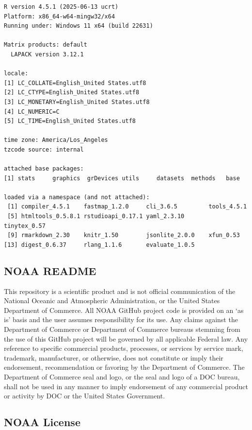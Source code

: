 \documentclass[
  letterpaper,
  oneside,
  open=any]{scrbook}
\begin{document}
\begin{verbatim}
R version 4.5.1 (2025-06-13 ucrt)
Platform: x86_64-w64-mingw32/x64
Running under: Windows 11 x64 (build 22631)

Matrix products: default
  LAPACK version 3.12.1

locale:
[1] LC_COLLATE=English_United States.utf8 
[2] LC_CTYPE=English_United States.utf8   
[3] LC_MONETARY=English_United States.utf8
[4] LC_NUMERIC=C                          
[5] LC_TIME=English_United States.utf8    

time zone: America/Los_Angeles
tzcode source: internal

attached base packages:
[1] stats     graphics  grDevices utils     datasets  methods   base     

loaded via a namespace (and not attached):
 [1] compiler_4.5.1    fastmap_1.2.0     cli_3.6.5         tools_4.5.1      
 [5] htmltools_0.5.8.1 rstudioapi_0.17.1 yaml_2.3.10       tinytex_0.57     
 [9] rmarkdown_2.30    knitr_1.50        jsonlite_2.0.0    xfun_0.53        
[13] digest_0.6.37     rlang_1.1.6       evaluate_1.0.5   
\end{verbatim}

\subsection{NOAA README}\label{noaa-readme-1}

This repository is a scientific product and is not official
communication of the National Oceanic and Atmospheric Administration, or
the United States Department of Commerce. All NOAA GitHub project code
is provided on an `as is' basis and the user assumes responsibility for
its use. Any claims against the Department of Commerce or Department of
Commerce bureaus stemming from the use of this GitHub project will be
governed by all applicable Federal law. Any reference to specific
commercial products, processes, or services by service mark, trademark,
manufacturer, or otherwise, does not constitute or imply their
endorsement, recommendation or favoring by the Department of Commerce.
The Department of Commerce seal and logo, or the seal and logo of a DOC
bureau, shall not be used in any manner to imply endorsement of any
commercial product or activity by DOC or the United States Government.

\subsection{NOAA License}\label{noaa-license-1}
\end{document}
